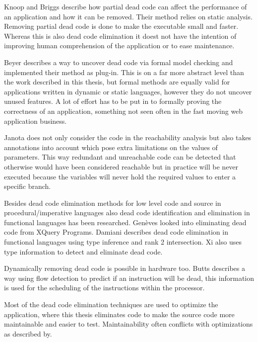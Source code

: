 Knoop\cite{knoop1994} and Briggs\cite{briggs1994} describe how partial dead code can affect the performance of an application and how it can be removed. Their method relies on static analysis. Removing partial dead code is done to make the executable small and faster. Whereas this is also dead code elimination it doest not have the intention of improving human comprehension of the application or to ease maintenance.
 

Beyer\cite{beyer2004} describes a way to uncover dead code via formal model checking and implemented their method as  plug-in. This is on a far more abstract level than the work described in this thesis, but formal methods are equally valid for applications written in dynamic or static languages, however they do not uncover unused features. A lot of effort has to be put in to formally proving the correctness of an application, something not seen often in the fast moving web application business.

Janota\cite{janota2007} does not only consider the code in the reachability analysis but also takes annotations into account which pose extra limitations on the values of parameters. This way redundant and unreachable code can be detected that otherwise would have been considered reachable but in practice will be never executed because the variables will never hold the required values to enter a specific branch.

Besides dead code elimination methods for low level code and source in procedural/imperative languages also dead code identification and elimination in functional languages has been researched. Gen\`eves\cite{geneves2010} looked into eliminating dead code from XQuery Programs. Damiani describes dead code elimination in functional languages using type inference\cite{damiani2000} and rank 2 intersection\cite{damiani1997}. Xi\cite{xi1998} also uses type information to detect and eliminate dead code. 


Dynamically removing dead code is possible in hardware too. Butts\cite{butts2002} describes a way using flow detection to predict if an instruction will be dead, this information is used for the scheduling of the instructions within the processor.

Most of the dead code elimination techniques are used to optimize the application, where this thesis eliminates code to make the source code more maintainable and easier to test\cite{huang2003}. Maintainability often conflicts with optimizations as described by\cite{andreopoulos2004,kiewkanya2005}.